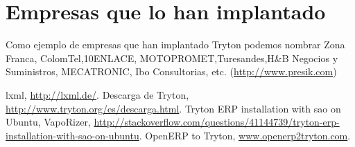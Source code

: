 \documentclass{article}
\begin{document}

\section{Empresas que lo han implantado}
Como ejemplo de empresas que han implantado Tryton podemos nombrar Zona Franca, ColomTel,10ENLACE, MOTOPROMET,Turesandes,H\&B Negocios y Suministros, MECATRONIC, Ibo Consultorias, etc.
(\url{http://www.presik.com})

\begin{thebibliography}{99}
 lxml, \url{http://lxml.de/}.
 Descarga de Tryton, \url{http://www.tryton.org/es/descarga.html}.
 Tryton ERP installation with sao on Ubuntu, VapoRizer, \url{http://stackoverflow.com/questions/41144739/tryton-erp-installation-with-sao-on-ubuntu}.
 OpenERP to Tryton, \url{www.openerp2tryton.com}.
\end{thebibliography}
\end{document}

